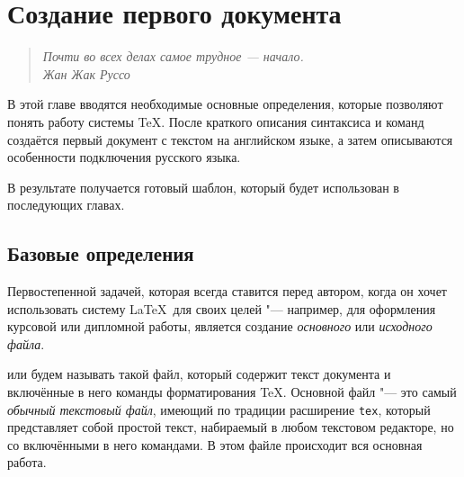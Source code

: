 	\chapter{Создание первого документа}\label{CH:MainFile}


\begin{quote}\em
Почти во всех делах самое трудное --- начало.\\[.3cm]
\mbox{}\hspace{\fill}\rm Жан Жак Руссо
\end{quote}


В этой главе вводятся необходимые основные определения, которые позволяют понять работу системы \TeX. После краткого описания синтаксиса и команд создаётся первый документ с текстом на английском языке, а затем описываются особенности подключения русского языка.

В результате получается готовый шаблон, который будет использован в последующих главах.




\section{Базовые определения}\label{Sec:MainFile-Definitions}

Первостепенной задачей, которая всегда ставится перед автором, когда он хочет использовать систему \LaTeX\ для своих целей "--- например, для оформления курсовой или дипломной работы, является создание \emph{основного} или \emph{исходного файла}.

 или  будем называть такой файл, который содержит текст документа и включённые в него команды форматирования \TeX. Основной файл "--- это самый \emph{обычный текстовый файл}, имеющий по традиции расширение \verb|tex|, который представляет собой простой текст, набираемый в любом текстовом редакторе, но со включёнными в него командами. В этом файле происходит вся основная работа.

